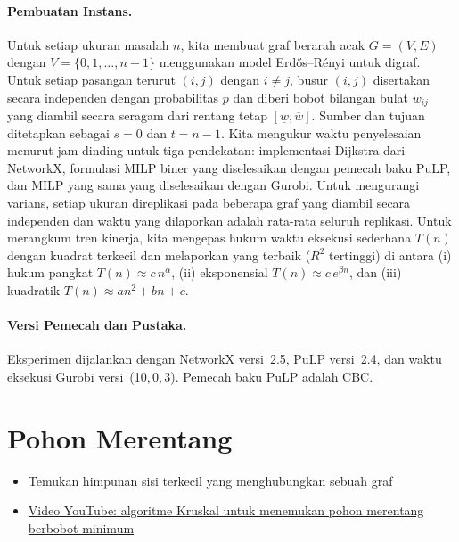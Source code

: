 \paragraph{Pembuatan Instans.}
Untuk setiap ukuran masalah \(n\), kita membuat graf berarah acak \(G=(V,E)\) dengan \(V=\{0,1,\dots,n-1\}\) menggunakan model Erd\H{o}s--R\'enyi untuk digraf. Untuk setiap pasangan terurut \((i,j)\) dengan \(i\neq j\), busur \((i,j)\) disertakan secara independen dengan probabilitas \(p\) dan diberi bobot bilangan bulat \(w_{ij}\) yang diambil secara seragam dari rentang tetap \([\underline{w},\overline{w}]\). Sumber dan tujuan ditetapkan sebagai \(s=0\) dan \(t=n-1\). Kita mengukur waktu penyelesaian menurut jam dinding untuk tiga pendekatan: implementasi Dijkstra dari NetworkX, formulasi MILP biner yang diselesaikan dengan pemecah baku PuLP, dan MILP yang sama yang diselesaikan dengan Gurobi. Untuk mengurangi varians, setiap ukuran direplikasi pada beberapa graf yang diambil secara independen dan waktu yang dilaporkan adalah rata-rata seluruh replikasi. Untuk merangkum tren kinerja, kita mengepas hukum waktu eksekusi sederhana \(T(n)\) dengan kuadrat terkecil dan melaporkan yang terbaik (\(R^2\) tertinggi) di antara (i) hukum pangkat \(T(n)\approx c\,n^{\alpha}\), (ii) eksponensial \(T(n)\approx c\,e^{\beta n}\), dan (iii) kuadratik \(T(n)\approx a n^2+ b n + c\).

\paragraph{Versi Pemecah dan Pustaka.}
Eksperimen dijalankan dengan NetworkX versi~2.5, PuLP versi~2.4, dan waktu eksekusi Gurobi versi~(10,\,0,\,3).  
Pemecah baku PuLP adalah CBC.

\section{Pohon Merentang}
\begin{outcome}
\begin{itemize}
\item Temukan himpunan sisi terkecil yang menghubungkan sebuah graf
\end{itemize}
\end{outcome}

\begin{resource}
\begin{itemize}
\item \href{https://www.youtube.com/watch?v=SfyrD-ktYew&ab_channel=KimberlyBrehm}{Video YouTube: algoritme Kruskal untuk menemukan pohon merentang berbobot minimum}
\end{itemize}
\end{resource}

